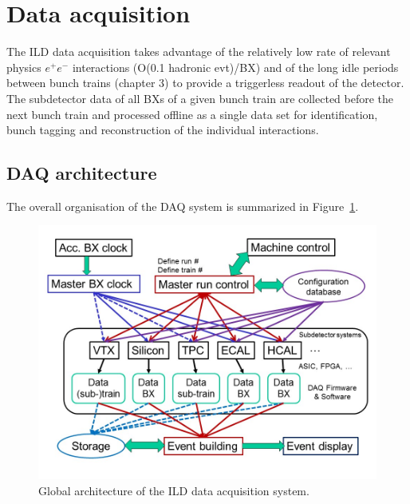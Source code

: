 \section{Data acquisition}

The ILD data acquisition takes advantage of the relatively low rate of relevant physics $e^+e^-$ interactions (O(0.1 hadronic evt)/BX) and of the long idle periods between bunch trains (chapter 3) to provide a triggerless readout of the detector. The subdetector data of all BXs of a given bunch train are collected before the next bunch train and processed offline as a single data set for identification, bunch tagging and reconstruction of the individual interactions. 


\subsection{DAQ architecture}

The overall organisation of the DAQ system is summarized in Figure~\ref{fig:integration:DAQ_architecture}. 

\begin{figure}[t!]
\centering
\includegraphics[width=0.9\hsize]{Integration/fig/DAQ_architecture.jpg}
\caption{\label{fig:integration:DAQ_architecture}Global architecture of the ILD data acquisition system.}
\end{figure}

